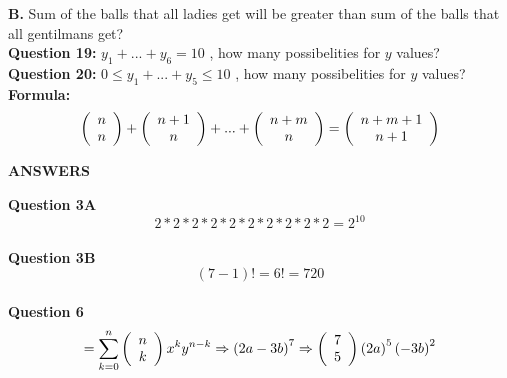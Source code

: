 \documentclass[11pt]{article}
\begin{document}
\textbf{B.} Sum of the balls that all ladies get will be greater than sum of the balls that all gentilmans get?
\\

\textbf{Question 19: } $y_1 + ... + y_6 = 10$ , how many possibelities for $y$ values?
\\ %

\textbf{Question 20: } $0 \leq y_1 + ... + y_5 \leq 10$ , how many possibelities for $y$ values?
\\ %

\textbf{Formula: } $$\left( {\begin{array}{*{20}c} n \\ n \\ \end{array}} \right) +  \left( 
{\begin{array}{*{20}c} n+1 \\ n \\ \end{array}} \right) + ... +  \left( {\begin{array}{*{20}c} n+m 
\\ n \\ \end{array}} \right) =  \left( {\begin{array}{*{20}c} n+m+1 \\ n+1 \\ \end{array}} 
\right)$$

\newpage

\begin{center}
\textbf{ANSWERS}
\end{center}

\textbf{Question 3A}\\
$$2*2*2*2*2*2*2*2*2*2 = 2^{10}$$\\

\textbf{Question 3B}\\
$$(7-1)! = 6! = 720$$\\

\textbf{Question 6}\\
$$= \sum\limits_{k = 0}^n {\left( {\begin{array}{*{20}c} n  \\ k  \\ \end{array}} \right) x^k y^{n-k}} \Rightarrow \left(2a-3b\right)^7 \Rightarrow \left( {\begin{array}{*{20}c} 7 \\ 5 \\ \end{array}} \right)\left(2a\right)^5\left(-3b\right)^2 $$
\end{document}
